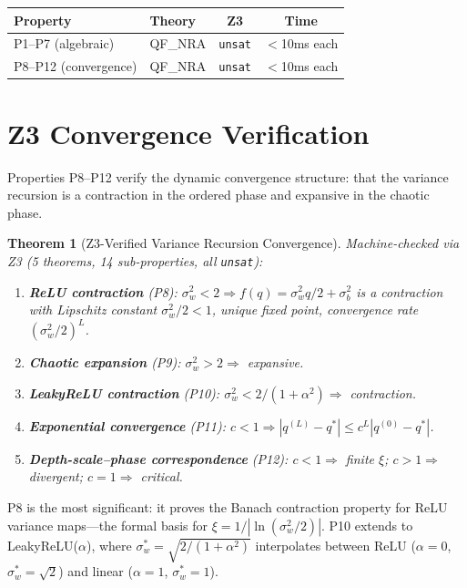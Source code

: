 \documentclass[10pt]{article}
\newtheorem{theorem}{Theorem}
\begin{document}
\begin{table}[h]
\centering
\small
\begin{tabular}{@{}llcc@{}}
\toprule
\textbf{Property} & \textbf{Theory} & \textbf{Z3} & \textbf{Time} \\
\midrule
P1--P7 (algebraic) & QF\_NRA & \texttt{unsat} & $<$10ms each \\
P8--P12 (convergence) & QF\_NRA & \texttt{unsat} & $<$10ms each \\
\bottomrule
\end{tabular}
\end{table}

\section{Z3 Convergence Verification}
\label{app:z3-convergence}

Properties P8--P12 verify the dynamic convergence structure: that the variance recursion is a contraction in the ordered phase and expansive in the chaotic phase.

\begin{theorem}[Z3-Verified Variance Recursion Convergence]
\label{thm:z3-contraction}
Machine-checked via Z3 (5 theorems, 14 sub-properties, all \texttt{unsat}):
\begin{enumerate}[nosep]
    \item \textbf{ReLU contraction} (P8): $\sigma_w^2 < 2 \Rightarrow f(q) = \sigma_w^2 q/2 + \sigma_b^2$ is a contraction with Lipschitz constant $\sigma_w^2/2 < 1$, unique fixed point, convergence rate $(\sigma_w^2/2)^L$.
    \item \textbf{Chaotic expansion} (P9): $\sigma_w^2 > 2 \Rightarrow$ expansive.
    \item \textbf{LeakyReLU contraction} (P10): $\sigma_w^2 < 2/(1+\alpha^2) \Rightarrow$ contraction.
    \item \textbf{Exponential convergence} (P11): $c < 1 \Rightarrow |q^{(L)} - q^*| \leq c^L |q^{(0)} - q^*|$.
    \item \textbf{Depth-scale--phase correspondence} (P12): $c < 1 \Rightarrow$ finite $\xi$; $c > 1 \Rightarrow$ divergent; $c = 1 \Rightarrow$ critical.
\end{enumerate}
\end{theorem}

P8 is the most significant: it proves the Banach contraction property for ReLU variance maps---the formal basis for $\xi = 1/|\ln(\sigma_w^2/2)|$.
P10 extends to LeakyReLU($\alpha$), where $\sigma_w^* = \sqrt{2/(1+\alpha^2)}$ interpolates between ReLU ($\alpha=0$, $\sigma_w^*=\sqrt{2}$) and linear ($\alpha=1$, $\sigma_w^*=1$).
\end{document}
